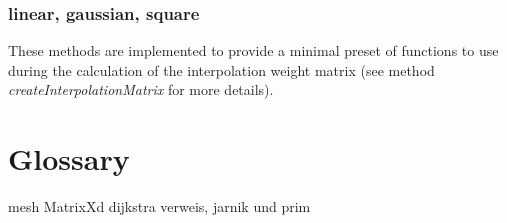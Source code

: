 \subsubsection{linear, gaussian, square}
These methods are implemented to provide a minimal preset of functions to use during the calculation of the interpolation weight matrix (see method \textit{createInterpolationMatrix} for more details).

\clearpage

\section{Glossary}
mesh
MatrixXd
dijkstra verweis,
jarnik und prim
  

